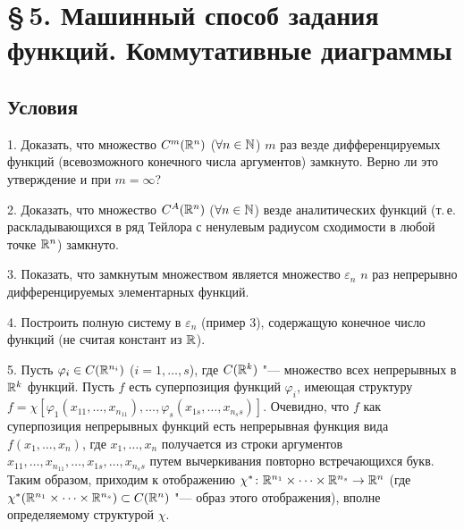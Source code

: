 \section*{\S\,5. Машинный способ задания функций. Коммутативные диаграммы}
\subsection*{Условия}
1. Доказать, что множество $C^m(\mathbb R^n)$ ($\forall n\in\mathbb N$) $m$ раз везде
дифференцируемых функций (всевозможного
конечного числа аргументов) замкнуто. Верно ли это утверждение и при
$m=\infty$?

2. Доказать, что множество $C^A(\mathbb R^n)$ ($\forall n\in\mathbb N$) везде
аналитических функций (т.\,е. раскладывающихся в ряд Тейлора с ненулевым
радиусом сходимости в любой точке $\mathbb R^n$) замкнуто.

3. Показать, что замкнутым множеством является множество $\varepsilon_n$
$n$ раз непрерывно дифференцируемых элементарных функций.

4. Построить полную систему в $\varepsilon_n$ (пример
3), содержащую конечное число функций (не считая
констант из $\mathbb R$).

5. Пусть $\varphi_i\in C(\mathbb R^{n_i})$ ($i=1,\dots,s$), где $C(\mathbb R^k)$ "---
множество всех непрерывных в $\mathbb R^k$ функций. Пусть $f$ есть суперпозиция
функций $\varphi_i$, имеющая структуру
$f=\chi[\varphi_1(x_{11},\dots,x_{n_11}),\dots,\varphi_s(x_{1s},\dots,x_{n_ss})]$.
Очевидно, что $f$ как суперпозиция непрерывных функций есть непрерывная
функция вида $f(x_1,\dots,x_n)$, где $x_1,\dots,x_n$ получается из строки
аргументов $x_{11},\dots,x_{n_11},\dots,x_{1s},\dots,x_{n_ss}$ путем
вычеркивания повторно встречающихся букв. Таким образом, приходим
к отображению $\chi^*\colon\mathbb R^{n_1}\times\dots\times\mathbb R^{n_s}\to\mathbb R^n$ (где
$\chi^*(\mathbb R^{n_1}\times\dots\times\mathbb R^{n_s})\subset C(\mathbb R^n)$ "--- образ этого
отображения), вполне определяемому структурой
$\chi$.

